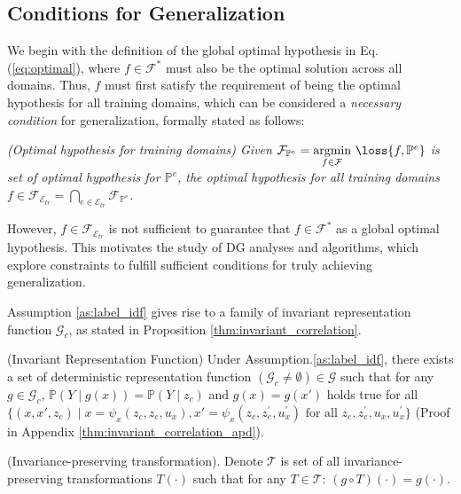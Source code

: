 \subsection{Conditions for Generalization}

We begin with the definition of the global optimal hypothesis in Eq. (\ref{eq:optimal}), where $f\in \mathcal{F}^*$
  must also be the optimal solution across all domains. Thus, $f$ must first satisfy the requirement of being the optimal hypothesis for all training domains, which can be considered a \textit{necessary condition} for generalization, formally stated as follows:

\begin{definition} \textit{(Optimal hypothesis for training domains) Given  $\mathcal{F}_{\mathbb{P}^e}=\underset{f\in \mathcal{F}}{\text{argmin}} \ \loss{f,\mathbb{P}^{e}}$ is set of optimal hypothesis for $\mathbb{P}^{e}$, the optimal hypothesis for all training domains $f\in\mathcal{F}_{\mathcal{E}_{tr}} = \bigcap_{{e}\in \mathcal{E}_{tr}}\mathcal{F}_{\mathbb{P}^e}$.}
\label{def:joint_optimal}
\end{definition}


However, $f \in \mathcal{F}_{\mathcal{E}_{tr}}$ is not sufficient to guarantee that $f \in \mathcal{F}^*$ as a global optimal hypothesis. This motivates the study of DG analyses and algorithms, which explore constraints to fulfill sufficient conditions for truly achieving generalization.


Assumption \ref{as:label_idf} gives rise to a family of invariant representation function $\mathcal{G}_c$, as stated in Proposition \ref{thm:invariant_correlation}. 

\begin{proposition} (Invariant Representation Function)
Under Assumption.\ref{as:label_idf}, there exists a set of deterministic representation function $(\mathcal{G}_c\neq \emptyset)\in \mathcal{G}$ such that for any $g\in \mathcal{G}_c$, $\mathbb{P}(Y\mid g(x)) = \mathbb{P}(Y\mid z_c)$ and $g(x)=g(x')$ holds true for all $\{(x,x',z_c)\mid  x= \psi_x(z_c, z_e, u_x), x'= \psi_x(z_c, z^{'}_e, u^{'}_x) \text{ for all }z_e,z^{'}_e, u_x, u^{'}_x\}$ (Proof in
Appendix \ref{thm:invariant_correlation_apd}).   
\label{thm:invariant_correlation}
\end{proposition}


\begin{definition} (Invariance-preserving  transformation). Denote $\mathcal{T}$ is set of all invariance-preserving  transformations  $T(\cdot)$ such that for any $T\in \mathcal{T}$: $(g\circ T)(\cdot)=g(\cdot)$.
\label{def:causal_transformation}
\end{definition}

